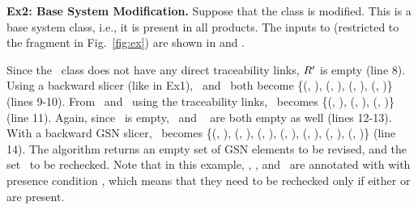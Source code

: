  \vspace{0.1in}
 \noindent
 {\bf Ex2:  Base System Modification.}
\label{sec:example2}
Suppose that the \term{\alarm} class is modified. This is a base system class, i.e., it is present in all products. The inputs to  (restricted to the fragment in Fig.~\ref{fig:ex}) are shown in  and .

Since the \alarm~class does not have any direct traceability links, $R'$ is empty (line 8). Using a backward slicer (like in Ex1), \Codm~and \Coam~both become \{(\alarm, \PC{\TT}), (\visual, \PC{\Fvisual}), (\audio, \PC{\Faudio}), (\LDWS, \PC{\Fldws})\} (lines 9-10). 
From \Codm~and \Coam~using the traceability links, \CtRecheck~becomes \{(\Geighteen, \PC{\Faudio}), (\Gnineteen, \PC{\Fvisual}), (\Gtwenty, \PC{\Fvisual})\} (line 11).
Again, since \Czd~is empty, \CtRevise~and \CrRechecko~ are both empty as well (lines 12-13). With a backward GSN slicer, \CtRecheckt~becomes \{(\Geighteen, \PC{\Faudio}), (\Gnineteen, \PC{\Fvisual}), (\Gtwenty, \PC{\Faudiovis}), (\Sneleven, \PC{\Fvisual}), (\Sntwelve, \PC{\Faudio}), (\Snfour, \PC{\Faudiovis}), (\Sneighteen, \PC{\Faudiovis})\} (line 14). 
The algorithm returns an empty set of GSN elements to be revised, and the set \CtRecheckt~to be rechecked. 
Note that in this example, \Gtwenty, \Snfour, and \Sneighteen~are annotated with  with presence condition \PC{\Faudiovis}, which means that they need to be rechecked only if either \PC{\Faudio} or \PC{\Fvisual} are present. 
